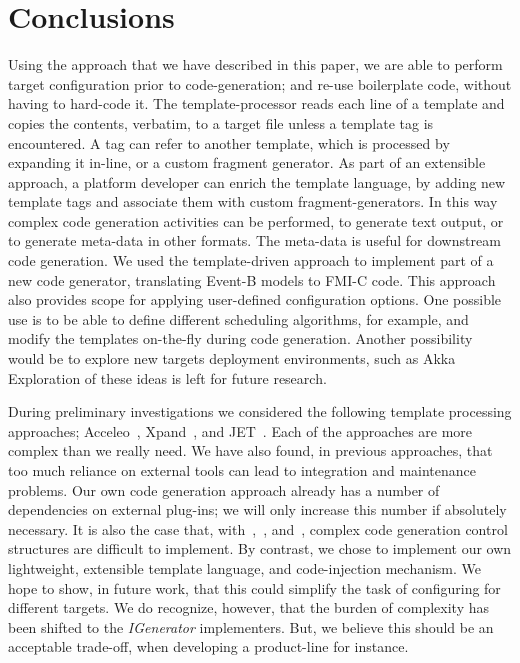 \documentclass{llncs}%
\begin{document}
%
\section{Conclusions}\label{conc}
Using the approach that we have described in this paper, we are able to perform target configuration prior to code-generation; and re-use boilerplate code, without having to hard-code it. The template-processor reads each line of a template and copies the contents, verbatim, to a target file unless a template tag is encountered. A tag can refer to another template, which is processed by expanding it in-line, or a custom fragment generator. As part of an extensible approach, a platform developer can enrich the template language, by adding new template tags and associate them with custom fragment-generators. In this way complex code generation activities can be performed, to generate text output, or  to generate meta-data in other formats. The meta-data is useful for downstream code generation. We used the template-driven approach to implement part of a new code generator, translating Event-B models to FMI-C code. This approach also provides scope for applying user-defined configuration options. One possible use is to be able to define different scheduling algorithms, for example, and modify the templates on-the-fly during code generation. Another possibility would be to explore new targets deployment environments, such as Akka~\cite{akka}
 Exploration of these ideas is left for future research.  

During preliminary investigations we considered the following template processing approaches; Acceleo~\cite{acceleo}, Xpand~\cite{xpand}, and JET~\cite{JET}. Each of the approaches are more complex than we really need. We have also found, in previous approaches, that too much reliance on external tools can lead to integration and maintenance problems. Our own code generation approach already has a number of dependencies on external plug-ins; we will only increase this number if absolutely necessary. It is also the case that, with~\cite{acceleo},~\cite{xpand}, and~\cite{JET}, complex code generation control structures are difficult to implement. By contrast, we chose to implement our own lightweight, extensible template language, and code-injection mechanism. We hope to show, in future work, that this could simplify the task of configuring for different targets. We do recognize, however, that the burden of complexity has been shifted to the \emph{IGenerator} implementers. But, we believe this should be an acceptable trade-off, when developing a product-line for instance. 
%


%
%
%
\end{document}
